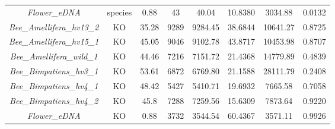\documentclass[11pt]{article}
\begin{document}
\begin{table}[H]
{\begin{tabular}{cccccccc}
\textit{Flower\_eDNA}            &species&0.88  &43  & 40.04       & 10.8380 & 3034.88 & 0.0132 \\
\textit{Bee\_Amellifera\_hv13\_2}&KO     &35.28 &9289& 9284.45     & 38.6844 & 10641.27& 0.8725 \\
\textit{Bee\_Amellifera\_hv15\_1}&KO     &45.05 &9046& 9102.78     & 43.8717 & 10453.98& 0.8707 \\
\textit{Bee\_Amellifera\_wild\_1}&KO     &44.46 &7216& 7151.72     & 21.4368 & 14779.89& 0.4839 \\
\textit{Bee\_Bimpatiens\_hv3\_1} &KO     &53.61 &6872& 6769.80     & 21.1588 & 28111.79& 0.2408 \\
\textit{Bee\_Bimpatiens\_hv4\_1} &KO     &48.42 &5427& 5410.71     & 19.6932 & 7665.58 & 0.7058 \\
\textit{Bee\_Bimpatiens\_hv4\_2} &KO     &45.8  &7288& 7259.56     & 15.6309 & 7873.64 & 0.9220 \\
\textit{Flower\_eDNA}            &KO     &0.88  &3732& 3544.54     & 60.4367 & 3571.11 & 0.9926 \\
      \bottomrule
      \end{tabular}%
      }
      \end{table}
\end{document}
